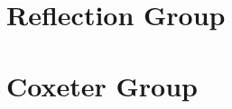 \documentclass[DIV         = 14,
               fontsize    = 10,
               index       = totoc,
               twoside,
               cadre,
               headings    = small
               ]{tkz-doc}
\begin{document}
\parindent=0pt
\clearpage

\clearpage
\tableofcontents

\clearpage
\newpage

\part{Reflection Group}



\part{Coxeter Group}

\clearpage\newpage
\small\printindex
\end{document}
